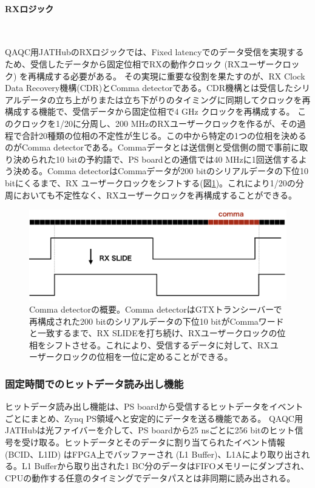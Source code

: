 \paragraph{RXロジック}　\par
QAQC用JATHubのRXロジックでは、Fixed latencyでのデータ受信を実現するため、受信したデータから固定位相でRXの動作クロック (RXユーザークロック) を再構成する必要がある。
その実現に重要な役割を果たすのが、RX Clock Data Recovery機構(CDR)とComma detectorである。CDR機構とは受信したシリアルデータの立ち上がりまたは立ち下がりのタイミングに同期してクロックを再構成する機能で、受信データから固定位相で4 GHz クロックを再構成する。
このクロックを1/20に分周し、200 MHzのRXユーザークロックを作るが、その過程で合計20種類の位相の不定性が生じる。この中から特定の1つの位相を決めるのがComma detectorである。Commaデータとは送信側と受信側の間で事前に取り決められた10 bitの予約語で、PS boardとの通信では40 MHzに1回送信するよう決める。Comma detectorはCommaデータが200 bitのシリアルデータの下位10 bitにくるまで、RX ユーザークロックをシフトする(図\ref{JATHubcomma})。これにより1/20の分周においても不定性なく、RXユーザークロックを再構成することができる。

\begin{figure} 
\centering
\includegraphics[width=16cm]{fig/QAQC/JATHubcomma.png}
\caption[Comma detectorの概要]{Comma detectorの概要。Comma detectorはGTXトランシーバーで再構成された200 bitのシリアルデータの下位10 bitがCommaワードと一致するまで、RX SLIDEを打ち続け、RXユーザークロックの位相をシフトさせる。これにより、受信するデータに対して、RXユーザークロックの位相を一位に定めることができる。}
\label{JATHubcomma}
\end{figure}




\subsubsection{固定時間でのヒットデータ読み出し機能}
\label{subsubsec_DAQ}
ヒットデータ読み出し機能は、PS boardから受信するヒットデータをイベントごとにまとめ、Zynq PS領域へと安定的にデータを送る機能である。
QAQC用JATHubは光ファイバーを介して、PS boardから25 nsごとに256 bitのヒット信号を受け取る。ヒットデータとそのデータに割り当てられたイベント情報 (BCID、L1ID) はFPGA上でバッファーされ (L1 Buffer)、L1Aにより取り出される。L1 Bufferから取り出された1 BC分のデータはFIFOメモリーにダンプされ、CPUの動作する任意のタイミングでデータパスとは非同期に読み出される。

